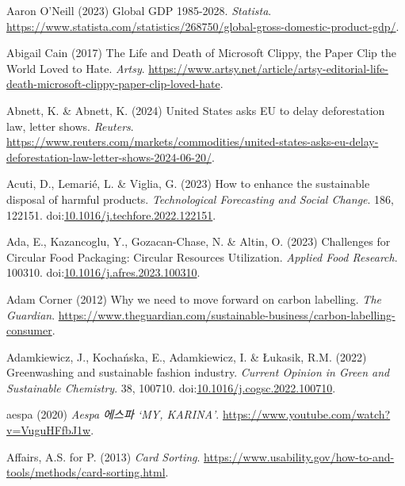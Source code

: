 \documentclass[
  letterpaper,
  DIV=11,
  numbers=noendperiod]{scrartcl}
\newlength{\cslhangindent}
\newenvironment{CSLReferences}[2] %
 {\begin{list}{}{%
  \setlength{\itemindent}{0pt}
  \setlength{\leftmargin}{0pt}
  \setlength{\parsep}{0pt}
  \ifodd #1
   \setlength{\leftmargin}{\cslhangindent}
   \setlength{\itemindent}{-1\cslhangindent}
  \fi
  \setlength{\itemsep}{#2\baselineskip}}}
 {\end{list}}
\begin{document}
\label{refs}
\begin{CSLReferences}{0}{1}
Aaron O'Neill (2023) Global {GDP} 1985-2028. \emph{Statista}.
\url{https://www.statista.com/statistics/268750/global-gross-domestic-product-gdp/}.

Abigail Cain (2017) The {Life} and {Death} of {Microsoft Clippy}, the
{Paper Clip} the {World Loved} to {Hate}. \emph{Artsy}.
\url{https://www.artsy.net/article/artsy-editorial-life-death-microsoft-clippy-paper-clip-loved-hate}.

Abnett, K. \& Abnett, K. (2024) United {States} asks {EU} to delay
deforestation law, letter shows. \emph{Reuters}.
\url{https://www.reuters.com/markets/commodities/united-states-asks-eu-delay-deforestation-law-letter-shows-2024-06-20/}.

Acuti, D., Lemarié, L. \& Viglia, G. (2023) How to enhance the
sustainable disposal of harmful products. \emph{Technological
Forecasting and Social Change}. 186, 122151.
doi:\href{https://doi.org/10.1016/j.techfore.2022.122151}{10.1016/j.techfore.2022.122151}.

Ada, E., Kazancoglu, Y., Gozacan-Chase, N. \& Altin, O. (2023)
Challenges for {Circular Food Packaging}: {Circular Resources
Utilization}. \emph{Applied Food Research}. 100310.
doi:\href{https://doi.org/10.1016/j.afres.2023.100310}{10.1016/j.afres.2023.100310}.

Adam Corner (2012) Why we need to move forward on carbon labelling.
\emph{The Guardian}.
\url{https://www.theguardian.com/sustainable-business/carbon-labelling-consumer}.

Adamkiewicz, J., Kochańska, E., Adamkiewicz, I. \& Łukasik, R.M. (2022)
Greenwashing and sustainable fashion industry. \emph{Current Opinion in
Green and Sustainable Chemistry}. 38, 100710.
doi:\href{https://doi.org/10.1016/j.cogsc.2022.100710}{10.1016/j.cogsc.2022.100710}.

aespa (2020) \emph{Aespa 에스파 {`{MY}, {KARINA}'}}.
\url{https://www.youtube.com/watch?v=VuguHFfbJ1w}.

Affairs, A.S. for P. (2013) \emph{Card {Sorting}}.
\url{https://www.usability.gov/how-to-and-tools/methods/card-sorting.html}.


\end{CSLReferences}
\end{document}
